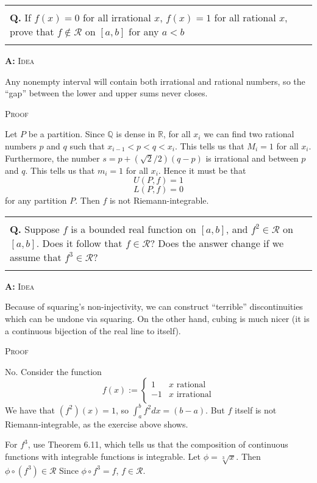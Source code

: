 \documentclass{article}
\newenvironment{myboxed}{\noindent\begin{tabular}{|p{.975\linewidth}|}\hline \\}{\\\\\hline\end{tabular}}
\newcounter{Question}
\newenvironment{Question} 
{\bigskip\begin{myboxed}\refstepcounter{Question}\par\noindent\textbf{Q\theQuestion.}}
{\end{myboxed}\bigskip}
\newenvironment{Answer} {\par\noindent\textbf{A:}} {}
\begin{document}
\begin{Question}
    If $f(x) = 0$ for all irrational $x$, $f(x) = 1$ for all rational $x$, prove that $f \notin \mathscr{R}$ on $[a, b]$ for any $a < b$
\end{Question}
\begin{Answer}
    \textsc{Idea}

    Any nonempty interval will contain both irrational and rational numbers, so the ``gap'' between the lower and upper sums never closes.

    \textsc{Proof}

    Let $P$ be a partition. Since $\mathbb{Q}$ is dense in $\mathbb{R}$, for all $x_i$ we can find two rational numbers $p$ and $q$ such that $x_{i-1} < p < q < x_i$. This tells us that $M_i = 1$ for all $x_i$. Furthermore, the number $s = p + (\sqrt{2}/2)(q-p)$ is irrational and between $p$ and $q$. This tells us that $m_i = 1$ for all $x_i$. Hence it must be that
    \[U(P, f) = 1\]
    \[L(P, f) = 0\]
    for any partition $P$. Then $f$ is not Riemann-integrable.
\end{Answer}


\begin{Question}
    Suppose $f$ is a bounded real function on $[a, b]$, and $f^2 \in \mathscr{R}$ on $[a,b]$. Does it follow that $f \in \mathscr{R}$? Does the answer change if we assume that $f^3 \in \mathscr{R}$?
\end{Question}
\begin{Answer}
    \textsc{Idea}

    Because of squaring's non-injectivity, we can construct ``terrible'' discontinuities which can be undone via squaring. On the other hand, cubing is much nicer (it is a continuous bijection of the real line to itself).

    \textsc{Proof}

    No. Consider the function
    \[
        f(x) := \begin{cases}
        1 & x \text{ rational} \\
        -1 & x \text{ irrational} \\
        \end{cases}
    \]
    We have that $(f^2)(x) = 1$, so $\int_a^b f^2 dx = (b-a)$. But $f$ itself is not Riemann-integrable, as the exercise above shows.

    For $f^3$, use Theorem 6.11, which tells us that the composition of continuous functions with integrable functions is integrable. Let $\phi = \sqrt[3]{x}$. Then $\phi \circ (f^3) \in \mathscr{R}$ Since $\phi \circ f^3 = f$, $f \in \mathscr{R}$.
\end{Answer}
\end{document}
